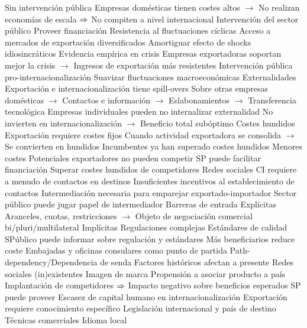 \documentclass{nuevotema}
\begin{document}
\begin{esquemal}
				\4 Sin intervención pública
				\4[] Empresas domésticas tienen costes altos
				\4[] $\to$ No realizan economías de escala
				\4[] $\Rightarrow$ No compiten a nivel internacional
				\4 Intervención del sector público
				\4[] Proveer financiación
			\3 Resistencia al fluctuaciones cíclicas
				\4 Acceso a mercados de exportación diversificados
				\4[] Amortiguar efecto de shocks idiosincráticos
				\4 Evidencia empírica en crisis
				\4[] Empresas exportadoras soportan mejor la crisis
				\4[] $\to$ Ingresos de exportación más resistentes
				\4 Intervención pública pro-internacionalización
				\4[] Suavizar fluctuaciones macroeconómicas
			\3 Externalidades
				\4 Exportación e internacionalización tiene spill-overs
				\4[] Sobre otras empresas domésticas
				\4[] $\to$ Contactos e información
				\4[] $\to$ Eslabonamientos
				\4[] $\to$ Transferencia tecnológica
				\4 Empresas individuales pueden no internalizar externalidad
				\4[] No invierten en internacionalización
				\4[] $\to$ Beneficio total subóptimo
			\3 Costes hundidos
				\4 Exportación requiere costes fijos
				\4[] Cuando actividad exportadora se consolida
				\4[] $\to$ Se convierten en hundidos
				\4 Incumbentes ya han superado costes hundidos
				\4[] Menores costes
				\4 Potenciales exportadores no pueden competir
				\4 SP puede facilitar financiación
				\4[] Superar costes hundidos de competidores
			\3 Redes sociales
				\4 CI requiere a menudo de contactos en destinos
				\4 Insuficientes incentivos al establecimiento de contactos
				\4 Intermediación necesaria para emparejar exportado-importador
				\4 Sector público puede jugar papel de intermediador
			\3 Barreras de entrada
				\4 Explícitas
				\4[] Aranceles, cuotas, restricciones
				\4[] $\to$ Objeto de negociación comercial bi/pluri/multilateral
				\4 Implícitas
				\4[] Regulaciones complejas
				\4[] Estándares de calidad
				\4 SPúblico puede informar sobre regulación y estándares
				\4[] Más beneficiarios reduce coste
				\4[] Embajadas y oficinas consulares como punto de partida
			\3 Path-dependency/Dependencia de senda
				\4 Factores históricos afectan a presente
				\4[] Redes sociales (in)existentes
				\4[] Imagen de marca
				\4[] Propensión a asociar producto a país
				\4[] Implantación de competidores
				\4[] $\Rightarrow$ Impacto negativo sobre beneficios esperados
				\4 SP puede proveer
			\3 Escasez de capital humano en internacionalización
				\4 Exportación requiere conocimiento específico
				\4[] Legislación internacional y país de destino
				\4[] Técnicas comerciales
				\4[] Idioma local

\end{esquemal}
\end{document}
